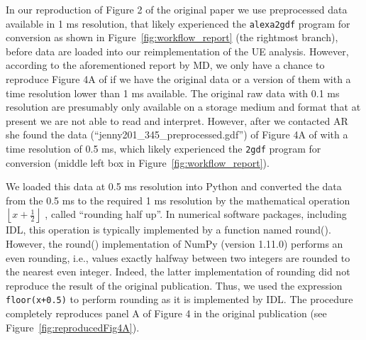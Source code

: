 \documentclass[10pt,a4paper,onecolumn]{article}
\begin{document}
In our reproduction of Figure 2 of the original paper we use
preprocessed data available in 1 ms resolution, that likely experienced
the \texttt{alexa2gdf} program for conversion as shown in
Figure~\ref{fig:workflow_report} (the rightmost branch), before data are
loaded into our reimplementation of the UE analysis. However, according
to the aforementioned report by MD, we only have a chance to reproduce
Figure 4A of \autocite{Riehle97} if we have the original data or a
version of them with a time resolution lower than 1 ms available. The
original raw data with 0.1 ms resolution are presumably only available
on a storage medium and format that at present we are not able to read
and interpret. However, after we contacted AR she found the data
(``jenny201\_345\_preprocessed.gdf'') of Figure 4A of
\autocite{Riehle97} with a time resolution of 0.5 ms, which likely
experienced the \texttt{2gdf} program for conversion (middle left box in
Figure~\ref{fig:workflow_report}).

We loaded this data at 0.5 ms resolution into Python and converted the
data from the 0.5 ms to the required 1 ms resolution by the mathematical
operation \(\left\lfloor x+\frac{1}{2}\right\rfloor\) , called
``rounding half up''. In numerical software packages, including IDL,
this operation is typically implemented by a function named round().
However, the round() implementation of NumPy (version 1.11.0) performs
an even rounding, i.e., values exactly halfway between two integers are
rounded to the nearest even integer. Indeed, the latter implementation
of rounding did not reproduce the result of the original publication.
Thus, we used the expression \texttt{floor(x+0.5)} to perform rounding
as it is implemented by IDL. The procedure completely reproduces panel A
of Figure 4 in the original publication (see
Figure~\ref{fig:reproducedFig4A}).
\end{document}
